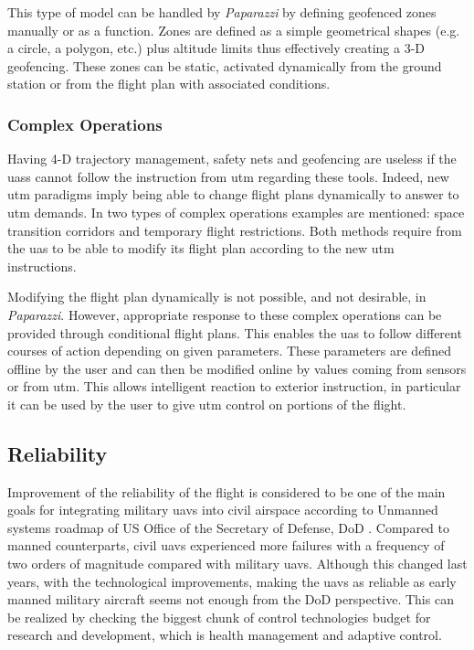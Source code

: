 		This type of model can be handled by \emph{Paparazzi} by defining geofenced zones manually or as a function. Zones are defined as a simple geometrical shapes (e.g. a circle, a polygon, etc.) plus altitude limits thus effectively creating a 3-D geofencing. 
		These zones can be static, activated dynamically from the ground station or from the flight plan with associated conditions.
	
	\subsubsection{Complex Operations}
		Having 4-D trajectory management, safety nets and geofencing are useless if the \gls{uas}s cannot follow the instruction from \gls{utm} regarding these tools.
		Indeed, new \gls{utm} paradigms imply being able to change flight plans dynamically to answer to \gls{utm} demands. In \cite{wargo_complex_2015} two types of complex operations examples are mentioned: space transition corridors and temporary flight restrictions.
		Both methods require from the \gls{uas} to be able to modify its flight plan according to the new \gls{utm} instructions.
		
		Modifying the flight plan dynamically is not possible, and not desirable, in \emph{Paparazzi}. However, appropriate response to these complex operations can be provided through conditional flight plans. This enables the \gls{uas} to follow different courses of action depending on given parameters. These parameters are defined offline by the user and can then be modified online by values coming from sensors or from \gls{utm}. This allows intelligent reaction to exterior instruction, in particular it can be used by the user to give \gls{utm} control on portions of the flight.
		
\subsection{Reliability}

Improvement of the reliability of the flight is considered to be one of the main goals for integrating military \gls{uav}s into civil airspace according to Unmanned systems roadmap of US Office of the Secretary of Defense, DoD \cite{UnmannedSystemsRoadmapDoD}. Compared to manned counterparts, civil \gls{uav}s experienced more failures with a frequency of two orders of magnitude compared with military \gls{uav}s.  Although this changed last years, with the technological improvements, making the \gls{uav}s as reliable as early manned military aircraft seems not enough from the DoD perspective. This can be realized by checking the biggest chunk of control technologies budget for research and development, which is health management and adaptive control.

